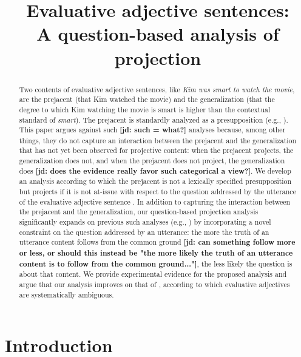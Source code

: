 \documentclass[11pt,fleqn]{article}
\title{Evaluative adjective sentences: \\ A question-based analysis of projection}
\author{}
\newcommand{\6}{\mbox{$[\hspace*{-.6mm}[$}}
\newcommand{\9}{\mbox{$]\hspace*{-.6mm}]$}}
\newcommand{\jd}[1]{\textbf{\color{red}[jd: #1]}}
\begin{document}

\maketitle


\begin{abstract}

Two contents of evaluative adjective sentences, like {\em Kim was smart to watch the movie}, are the prejacent (that Kim watched the movie) and the generalization (that the degree to which Kim watching the movie is smart is higher than the contextual standard of {\em smart}). The prejacent is standardly analyzed as a presupposition
(e.g., \citealt{norrick78,barker02,oshima09b,kertz2010}). This paper argues against such \jd{such = what?} analyses because, among other things, they do not capture an interaction between the prejacent and the generalization that has not yet been observed for projective content: when the prejacent projects, the generalization does not, and when the prejacent does not project, the generalization does \jd{does the evidence really favor such categorical a view?}. We develop an analysis according to which the prejacent is not a lexically specified presupposition but projects if it is not at-issue with respect to the question addressed by the utterance of the evaluative adjective sentence . In addition to capturing the interaction between the prejacent and the generalization, our question-based projection analysis significantly expands on previous such analyses (e.g., \citealt{beaver-clark08,best-question,brst-ar,abrusan2011}) by incorporating a novel constraint on the question addressed by an utterance: the more the truth of an utterance content follows from the common ground \jd{can something follow more or less, or should this instead be "the more likely the truth of an utterance content is to follow from the common ground..."}, the less likely the question is about that content. We provide experimental evidence for the proposed analysis and argue that our analysis improves on that of \citealt{karttunen-etal2014}, according to which evaluative adjectives are systematically ambiguous. 

\end{abstract}


\section{Introduction}\label{s1}
\end{document}
